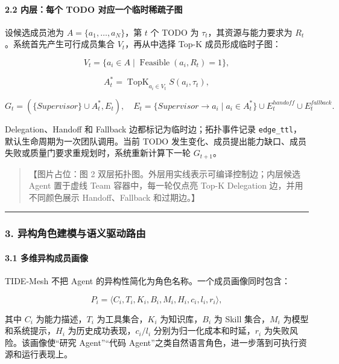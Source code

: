 \documentclass[UTF8,a4paper,12pt]{ctexart}
\begin{document}
\paragraph{2.2 内层：每个 TODO 对应一个临时稀疏子图}

设候选成员池为 \(A=\{a_1,\ldots,a_N\}\)，第 \(t\) 个 TODO 为 \(\tau_t\)，其资源与能力要求为 \(R_t\)。系统首先产生可行成员集合 \(V_t\)，再从中选择 Top-K 成员形成临时子图：

\[
V_t=\{a_i\in A\mid \operatorname{Feasible}(a_i,R_t)=1\},
\]

\[
A_t^{*}=\operatorname{TopK}_{a_i\in V_t}S(a_i,\tau_t),
\]

\[
G_t=(\{Supervisor\}\cup A_t^{*},E_t),\quad
E_t=\{Supervisor\rightarrow a_i\mid a_i\in A_t^{*}\}\cup E_t^{handoff}\cup E_t^{fallback}.
\]

Delegation、Handoff 和 Fallback 边都标记为临时边；拓扑事件记录 \texttt{edge\_ttl}，默认生命周期为一次团队调用。当前 TODO 发生变化、成员提出能力缺口、成员失败或质量门要求重规划时，系统重新计算下一轮 \(G_{t+1}\)。

\begin{quote}
【图片占位：图 2 双层拓扑图。外层用实线表示可编译控制边；内层候选 Agent 置于虚线 Team 容器中，每一轮仅点亮 Top-K Delegation 边，并用不同颜色展示 Handoff、Fallback 和过期边。】
\end{quote}

\begin{center}\rule{0.5\linewidth}{0.5pt}\end{center}

\subsubsection{3. 异构角色建模与语义驱动路由}

\paragraph{3.1 多维异构成员画像}

TIDE-Mesh 不把 Agent 的异构性简化为角色名称。一个成员画像同时包含：

\[
P_i=\langle C_i,T_i,K_i,B_i,M_i,H_i,c_i,l_i,r_i\rangle,
\]

其中 \(C_i\) 为能力描述，\(T_i\) 为工具集合，\(K_i\) 为知识库，\(B_i\) 为 Skill 集合，\(M_i\) 为模型和系统提示，\(H_i\) 为历史成功表现，\(c_i/l_i\) 分别为归一化成本和时延，\(r_i\) 为失败风险。该画像使``研究 Agent''``代码 Agent''之类自然语言角色，进一步落到可执行资源和运行表现上。
\end{document}

